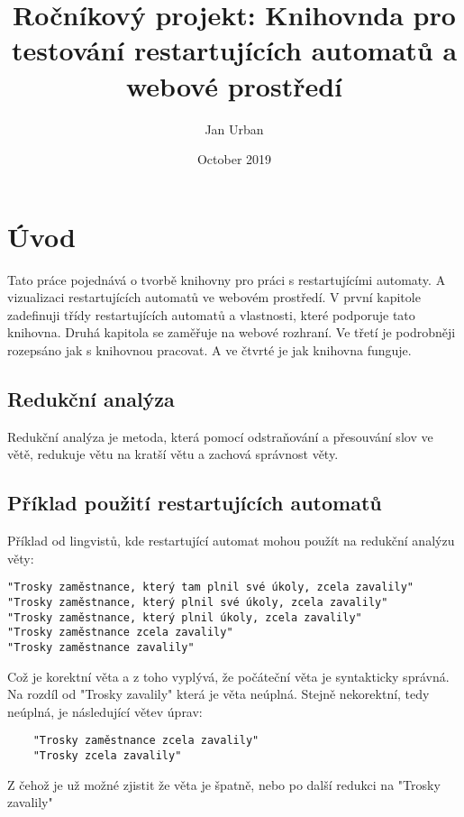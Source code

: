 \documentclass{article}
\title{ Ročníkový projekt: Knihovnda pro testování restartujících automatů a webové prostředí}
\author{Jan Urban}
\date{October 2019}
\begin{document}
\maketitle

\newpage

\tableofcontents

\newpage

\section*{Úvod}

Tato práce pojednává o tvorbě knihovny pro práci s restartujícími automaty.
A vizualizaci restartujících automatů ve webovém prostředí.
V první kapitole zadefinuji třídy restartujících automatů a vlastnosti, které podporuje tato knihovna.
Druhá kapitola se zaměřuje na webové rozhraní.
Ve třetí je podrobněji rozepsáno jak s knihovnou pracovat.
A ve čtvrté je jak knihovna funguje.

\subsection{Redukční analýza}
Redukční analýza je metoda, která pomocí odstraňování a přesouvání slov ve větě,
redukuje větu na kratší větu a zachová správnost věty.


\subsection{Příklad použití restartujících automatů}
Příklad od lingvistů, kde restartující automat mohou použít na redukční analýzu věty:

\begin{verbatim}
"Trosky zaměstnance, který tam plnil své úkoly, zcela zavalily"
"Trosky zaměstnance, který plnil své úkoly, zcela zavalily"
"Trosky zaměstnance, který plnil úkoly, zcela zavalily"
"Trosky zaměstnance zcela zavalily"
"Trosky zaměstnance zavalily"
\end{verbatim}

Což je korektní věta a z toho vyplývá, že počáteční věta je syntakticky správná.
Na rozdíl od "Trosky zavalily" která je věta neúplná.
Stejně nekorektní, tedy neúplná, je následující větev úprav:

\begin{verbatim}
	"Trosky zaměstnance zcela zavalily"
	"Trosky zcela zavalily"
\end{verbatim}

Z čehož je už možné zjistit že věta je špatně, nebo po další redukci na "Trosky zavalily"
\end{document}
